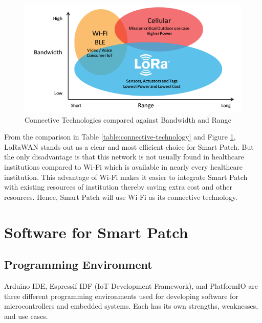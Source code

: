 \begin{figure}
        \centering
        \includegraphics[width=\linewidth]{images/connective-technology.png}
        \caption{Connective Technologies compared against Bandwidth and Range \cite{ref29}}
        \label{fig:connective-technology}
    \end{figure}

From the comparison in Table \ref{table:connective-technology} and Figure \ref{fig:connective-technology}, LoRaWAN stands out as a clear and most efficient choice for Smart Patch. But the only disadvantage is that this network is not usually found in healthcare institutions compared to Wi-Fi which is available in nearly every healthcare institution. This advantage of Wi-Fi makes it easier to integrate Smart Patch with existing resources of institution thereby saving extra cost and other resources. Hence, Smart Patch will use Wi-Fi as its connective technology.

\newpage
\section{Software for Smart Patch}
\subsection{Programming Environment}
Arduino IDE, Espressif IDF (IoT Development Framework), and PlatformIO are three different programming environments used for developing software for microcontrollers and embedded systems. Each has its own strengths, weaknesses, and use cases.

